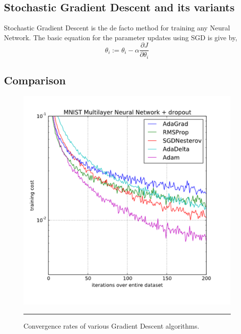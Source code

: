 \subsection*{Stochastic Gradient Descent and its variants}
Stochastic Gradient Descent is the de facto method for training any Neural Network. The basic equation for the parameter updates using SGD is give by,
\begin{equation}
\theta_ i := \theta_i - \alpha \frac{\partial J}{\partial \theta_i}
\end{equation}
\subsection*{Comparison}

\begin{figure}[H]
	\centering
	\includegraphics[scale=0.4]{Pictures/convergrate.png}
	\rule{35em}{0.5pt}
	\caption[gd]{Convergence rates of various Gradient Descent algorithms.}
	\label{fig:converg}
\end{figure}




